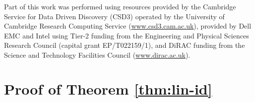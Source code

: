 \documentclass{article} %
\theoremstyle{plain}
\theoremstyle{definition}
\theoremstyle{remark}
\begin{document}
Part of this work was performed using resources provided by the Cambridge Service for Data Driven Discovery (CSD3) operated by the University of Cambridge Research Computing Service (\url{www.csd3.cam.ac.uk}), provided by Dell EMC and Intel using Tier-2 funding from the Engineering and Physical Sciences Research Council (capital grant EP/T022159/1), and DiRAC funding from the Science and Technology Facilities Council (\url{www.dirac.ac.uk}).




\clearpage

\appendix
\section{Proof of Theorem \ref{thm:lin-id}}\label{appendix:proof-lin-id}
\end{document}
